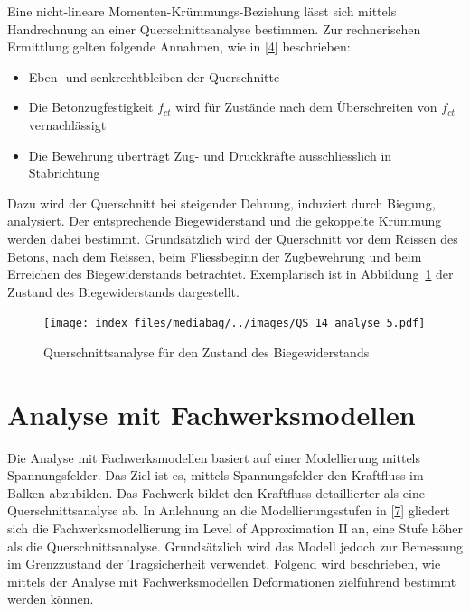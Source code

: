 \documentclass[
  12pt,
  letterpaper,
  egregdoesnotlikesansseriftitles]{scrreprt}
\providecommand{\tightlist}{%
  \setlength{\itemsep}{0pt}\setlength{\parskip}{0pt}}\usepackage{longtable,booktabs,array}
\begin{document}
Eine nicht-lineare Momenten-Krümmungs-Beziehung lässt sich mittels
Handrechnung an einer Querschnittsanalyse bestimmen. Zur rechnerischen
Ermittlung gelten folgende Annahmen, wie in
{[}\protect\hyperlink{ref-Spathelf2022}{4}{]} beschrieben:

\begin{itemize}
\tightlist
\item
  Eben- und senkrechtbleiben der Querschnitte
\item
  Die Betonzugfestigkeit \(f_{ct}\) wird für Zustände nach dem
  Überschreiten von \(f_{ct}\) vernachlässigt
\item
  Die Bewehrung überträgt Zug- und Druckkräfte ausschliesslich in
  Stabrichtung
\end{itemize}

Dazu wird der Querschnitt bei steigender Dehnung, induziert durch
Biegung, analysiert. Der entsprechende Biegewiderstand und die
gekoppelte Krümmung werden dabei bestimmt. Grundsätzlich wird der
Querschnitt vor dem Reissen des Betons, nach dem Reissen, beim
Fliessbeginn der Zugbewehrung und beim Erreichen des Biegewiderstands
betrachtet. Exemplarisch ist in Abbildung~\ref{fig-exemplar_qs_analyse}
der Zustand des Biegewiderstands dargestellt.

\begin{figure}[H]

{\centering \texttt{[image: index\_files/mediabag/../images/QS\_14\_analyse\_5.pdf]}

}

\caption{\label{fig-exemplar_qs_analyse}Querschnittsanalyse für den
Zustand des Biegewiderstands}

\end{figure}

\hypertarget{sec-fachwerk}{%
\section{Analyse mit Fachwerksmodellen}\label{sec-fachwerk}}

Die Analyse mit Fachwerksmodellen basiert auf einer Modellierung mittels
Spannungsfelder. Das Ziel ist es, mittels Spannungsfelder den Kraftfluss
im Balken abzubilden. Das Fachwerk bildet den Kraftfluss detaillierter
als eine Querschnittsanalyse ab. In Anlehnung an die Modellierungsstufen
in {[}\protect\hyperlink{ref-Thoma2020}{7}{]} gliedert sich die
Fachwerksmodellierung im Level of Approximation II an, eine Stufe höher
als die Querschnittsanalyse. Grundsätzlich wird das Modell jedoch zur
Bemessung im Grenzzustand der Tragsicherheit verwendet. Folgend wird
beschrieben, wie mittels der Analyse mit Fachwerksmodellen Deformationen
zielführend bestimmt werden können.
\end{document}

